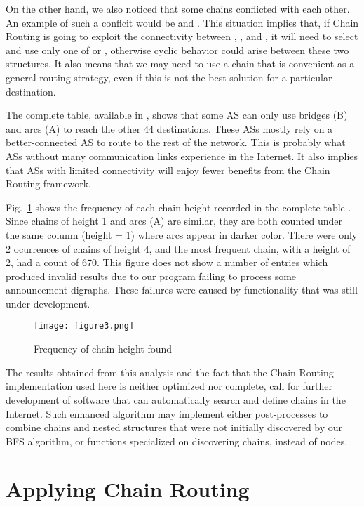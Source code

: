 \documentclass[5p,twocolumn]{elsarticle}
\begin{document}
On the other hand, we also noticed that some chains conflicted with each other. An example of such a conflcit would be  and . This situation implies that, if Chain Routing is going to exploit the connectivity between , , and , it will need to select and use only one of  or , otherwise cyclic behavior could arise between these two structures. It also means that we may need to use a chain that is convenient as a general routing strategy, even if this is not the best solution for a particular destination.

The complete table, available in \cite{Arjona-Villicana2010a}, shows that some AS can only use bridges (B) and arcs (A) to reach the other 44 destinations. These ASs mostly rely on a better-connected AS to route to the rest of the network. This is probably what ASs without many communication links experience in the Internet. It also implies that ASs with limited connectivity will enjoy fewer benefits from the Chain Routing framework.

Fig.\ \ref{fig:FreqofHeight}  shows the frequency of each chain-height recorded in the complete table \cite{Arjona-Villicana2010a}. Since chains of height 1 and arcs (A) are similar, they are both counted under the same column (height = 1) where arcs appear in darker color. There were only 2 ocurrences of chains of height 4, and the most frequent chain, with a height of 2, had a count of 670. This figure does not show a number of entries which produced invalid results due to our program failing to process some announcement digraphs. These failures were caused by functionality that was still under development.

\begin{figure}[t]
	\centering
		\texttt{[image: figure3.png]}
	\caption{Frequency of chain height found}
	\label{fig:FreqofHeight}
\end{figure}

The results obtained from this analysis and the fact that the Chain Routing implementation used here is neither optimized nor complete, call for further development of software that can automatically search and define chains in the Internet. Such enhanced algorithm may implement either post-processes to combine chains and nested structures that were not initially discovered by our BFS algorithm, or functions specialized on discovering chains, instead of nodes.






\section{Applying Chain Routing}\label{applying}
\end{document}
